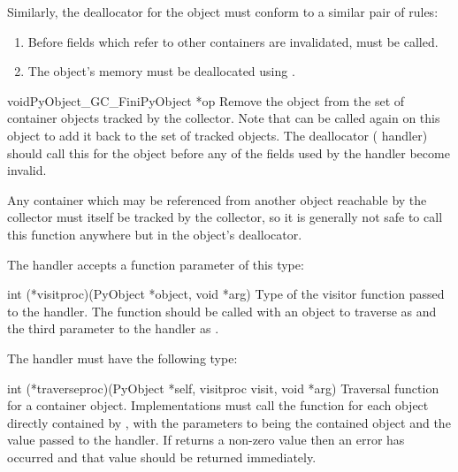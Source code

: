 \documentclass{manual}
\begin{document}
Similarly, the deallocator for the object must conform to a similar
pair of rules:

\begin{enumerate}
\item  Before fields which refer to other containers are invalidated,
        must be called.

\item  The object's memory must be deallocated using
       .
\end{enumerate}

\begin{cfuncdesc}{void}{PyObject_GC_Fini}{PyObject *op}
  Remove the object  from the set of container objects tracked
  by the collector.  Note that  can be
  called again on this object to add it back to the set of tracked
  objects.  The deallocator ( handler) should call
  this for the object before any of the fields used by the
   handler become invalid.

    Any container which may be referenced from another
  object reachable by the collector must itself be tracked by the
  collector, so it is generally not safe to call this function
  anywhere but in the object's deallocator.
\end{cfuncdesc}

The  handler accepts a function parameter of this
type:

\begin{ctypedesc}[visitproc]{int (*visitproc)(PyObject *object, void *arg)}
  Type of the visitor function passed to the 
  handler.  The function should be called with an object to traverse
  as  and the third parameter to the 
  handler as .
\end{ctypedesc}

The  handler must have the following type:

\begin{ctypedesc}[traverseproc]{int (*traverseproc)(PyObject *self,
                                visitproc visit, void *arg)}
  Traversal function for a container object.  Implementations must
  call the  function for each object directly contained by
  , with the parameters to  being the contained
  object and the  value passed to the handler.  If
   returns a non-zero value then an error has occurred and
  that value should be returned immediately.
\end{ctypedesc}
\end{document}
